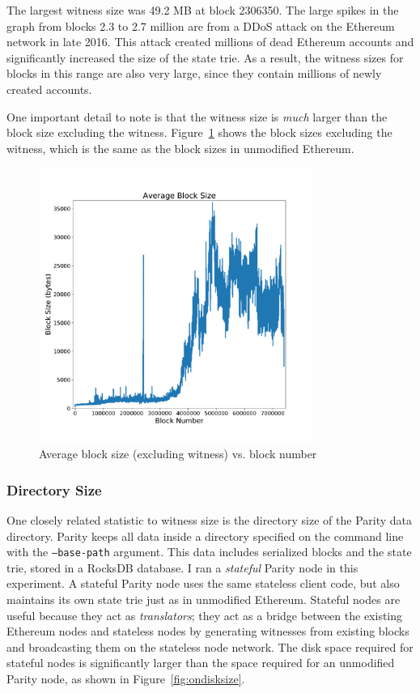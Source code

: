 \documentclass[12pt]{article}
\begin{document}
The largest witness size was 49.2 MB at block 2306350. The large spikes in the graph from blocks 2.3 to 2.7 million are from a DDoS attack on the Ethereum network in late 2016. This attack created millions of dead Ethereum accounts and significantly increased the size of the state trie. As a result, the witness sizes for blocks in this range are also very large, since they contain millions of newly created accounts.

One important detail to note is that the witness size is \emph{much} larger than the block size excluding the witness. Figure~\ref{fig:blocksize} shows the block sizes excluding the witness, which is the same as the block sizes in unmodified Ethereum.

\begin{figure}[H]
  \centering
  \includegraphics[width=0.8\textwidth]{../figures/results/graphs/background/block-size.pdf}
  \caption{Average block size (excluding witness) vs. block number}
  \label{fig:blocksize}
\end{figure}


\subsubsection{Directory Size}

One closely related statistic to witness size is the directory size of the Parity data directory. Parity keeps all data inside a directory specified on the command line with the \texttt{--base-path} argument. This data includes serialized blocks and the state trie, stored in a RocksDB database. I ran a \emph{stateful} Parity node in this experiment. A stateful Parity node uses the same stateless client code, but also maintains its own state trie just as in unmodified Ethereum. Stateful nodes are useful because they act as \emph{translators}; they act as a bridge between the existing Ethereum nodes and stateless nodes by generating witnesses from existing blocks and broadcasting them on the stateless node network. The disk space required for stateful nodes is significantly larger than the space required for an unmodified Parity node, as shown in Figure~\ref{fig:ondisksize}.
\end{document}
